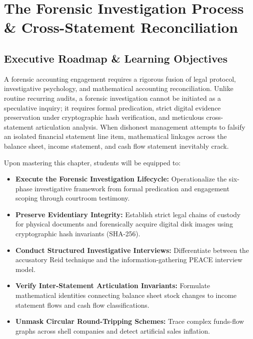 \chapter{The Forensic Investigation Process \& Cross-Statement Reconciliation}

\section{Executive Roadmap \& Learning Objectives}

A forensic accounting engagement requires a rigorous fusion of legal protocol, investigative psychology, and mathematical accounting reconciliation. Unlike routine recurring audits, a forensic investigation cannot be initiated as a speculative inquiry; it requires formal predication, strict digital evidence preservation under cryptographic hash verification, and meticulous cross-statement articulation analysis. When dishonest management attempts to falsify an isolated financial statement line item, mathematical linkages across the balance sheet, income statement, and cash flow statement inevitably crack.

\begin{tcolorbox}[colback=primarylight, colframe=primarydark, title={\textbf{Core Learning Competencies}}]
Upon mastering this chapter, students will be equipped to:
\begin{itemize}
    \item \textbf{Execute the Forensic Investigation Lifecycle:} Operationalize the six-phase investigative framework from formal predication and engagement scoping through courtroom testimony.
    \item \textbf{Preserve Evidentiary Integrity:} Establish strict legal chains of custody for physical documents and forensically acquire digital disk images using cryptographic hash invariants (SHA-256).
    \item \textbf{Conduct Structured Investigative Interviews:} Differentiate between the accusatory Reid technique and the information-gathering PEACE interview model.
    \item \textbf{Verify Inter-Statement Articulation Invariants:} Formulate mathematical identities connecting balance sheet stock changes to income statement flows and cash flow classifications.
    \item \textbf{Unmask Circular Round-Tripping Schemes:} Trace complex funds-flow graphs across shell companies and detect artificial sales inflation.
\end{itemize}
\end{tcolorbox}

